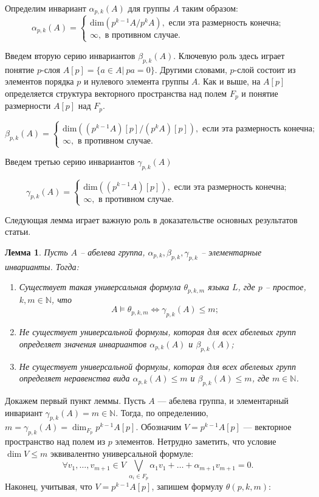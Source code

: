 \documentclass[a4paper,11pt,twoside]{article}
\newtheorem{lemma}{Лемма}[section]
\def\proof{{\noindent{\bf Доказательство.}} }
\def\N{{\mathbb{N}}}
\begin{document}
Определим инвариант $\alpha_{p,k}(A)$ для группы $A$ таким образом:
$$\alpha_{p,k}(A) = \left\lbrace 
\begin{array}{l}  
\mathrm{dim} \left( p^{k-1}A \Big/ p^k A \right), \text{ если эта размерность конечна;} \\ 
\infty, \text{ в противном случае.}
\end{array} 
\right.$$

Введем вторую серию инвариантов $\beta_{p,k}(A)$. Ключевую роль здесь играет понятие $p$-слоя $A[p] = \{a \in A | \ pa = 0\}$. Другими словами, $p$-слой состоит из элементов порядка $p$ и нулевого элемента группы $A$. Как и выше, на $A[p]$ определяется структура векторного пространства над полем $F_p$ и понятие размерности $A[p]$ над $F_p$.

$$\beta_{p,k}(A) = \left\lbrace 
\begin{array}{l}  
\mathrm{dim} \left( (p^{k-1}A) [p] \Big/ (p^k A) [p] \right), \text{ если эта размерность конечна;} \\ 
\infty, \text{ в противном случае.}
\end{array} 
\right.$$

Введем третью серию инвариантов $\gamma_{p,k}(A)$

$$\gamma_{p,k}(A) = \left\lbrace 
\begin{array}{l}  
\mathrm{dim} \left( (p^{k-1} A) [p] \right), \text{ если эта размерность конечна;} \\ 
\infty, \text{ в противном случае.}
\end{array} 
\right.$$

Следующая лемма играет важную роль в доказательстве основных результатов статьи.

\begin{lemma}\label{lemma:gamma}
Пусть $A$ -- абелева группа, $\alpha_{p,k}, \beta_{p,k}, \gamma_{p,k}$ -- элементарные инварианты. Тогда:
\begin{enumerate}
\item Существует такая универсальная формула $\theta_{p,k,m}$ языка $L$, где $p$ -- простое, $k,m \in \N$, что 
$$A \models \theta_{p,k,m} \Leftrightarrow \gamma_{p,k}(A) \leq m;$$
\item Не существует универсальной формулы, которая для всех абелевых групп определяет значения инвариантов $\alpha_{p,k}(A)$ и $\beta_{p,k}(A)$;

\item Не существует универсальной формулы, которая для всех абелевых групп определяет неравенства вида $\alpha_{p,k}(A) \leq m$ и $\beta_{p,k}(A) \leq m$, где $m \in \N$.
\end{enumerate}
\end{lemma}
\proof Докажем первый пункт леммы. Пусть $A$ --- абелева группа, и элементарный инвариант $\gamma_{p,k}(A) = m \in \N$. Тогда, по определению, $m = \gamma_{p,k} (A) = \dim_{F_p} p^{k-1} A[p]$. Обозначим $V = p^{k-1} A[p]$ --- векторное пространство над полем из $p$ элементов. Нетрудно заметить, что условие $\dim V \leq m$ эквивалентно универсальной формуле: 
$$\forall v_1, \ldots, v_{m+1} \in V \ \bigvee_{\alpha_i \in F_p} \alpha_1v_1 + \ldots + \alpha_{m+1}v_{m+1} = 0.$$
Наконец, учитывая, что $V = p^{k-1}A[p]$, запишем формулу $\theta(p,k,m)$:
\end{document}
